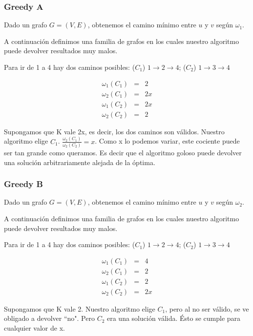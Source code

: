 \subsubsection{Greedy A}\label{subsubsec:greedy-a}
Dado un grafo $G = (V,E)$, obtenemos el camino m\'inimo entre $u$ y $v$ seg\'un $\omega_1$. 

A continuación definimos una familia de grafos en los cuales nuestro algoritmo puede devolver resultados muy malos.

Para ir de 1 a 4 hay dos caminos posibles: ($C_1$) $1 \rightarrow 2 \rightarrow 4$; ($C_2$) $1 \rightarrow 3 \rightarrow 4$

\begin{eqnarray}
 \omega_1(C_1) &=& 2 	\\ 
 \omega_2(C_1) &=& 2x	\\
 \omega_1(C_2) &=& 2x	\\
 \omega_2(C_2) &=& 2
\end{eqnarray}

Supongamos que K vale 2x, es decir, los dos caminos son válidos. Nuestro algoritmo elige $C_1$.
$\frac{\omega_2(C_1)}{\omega_2(C_2)} = x$.
Como x lo podemos variar, este cociente puede ser tan grande como queramos. Es decir que el algoritmo goloso puede devolver una solución
arbitrariamente alejada de la óptima.

\clearpage
\subsubsection{Greedy B}\label{subsubsec:greedy-b}
Dado un grafo $G = (V,E)$, obtenemos el camino m\'inimo entre $u$ y $v$ seg\'un $\omega_2$. 

A continuación definimos una familia de grafos en los cuales nuestro algoritmo puede devolver resultados muy malos.

Para ir de 1 a 4 hay dos caminos posibles: ($C_1$) $1 \rightarrow 2 \rightarrow 4$; ($C_2$) $1 \rightarrow 3 \rightarrow 4$

\begin{eqnarray}
 \omega_1(C_1) &=& 4 	\\ 
 \omega_2(C_1) &=& 2	\\
 \omega_1(C_2) &=& 2	\\
 \omega_2(C_2) &=& 2x
\end{eqnarray}

Supongamos que K vale 2. Nuestro algoritmo elige $C_1$, pero al no ser válido, se ve obligado a devolver ``no". Pero $C_2$ era una solución
válida. Ésto se cumple para cualquier valor de x.

